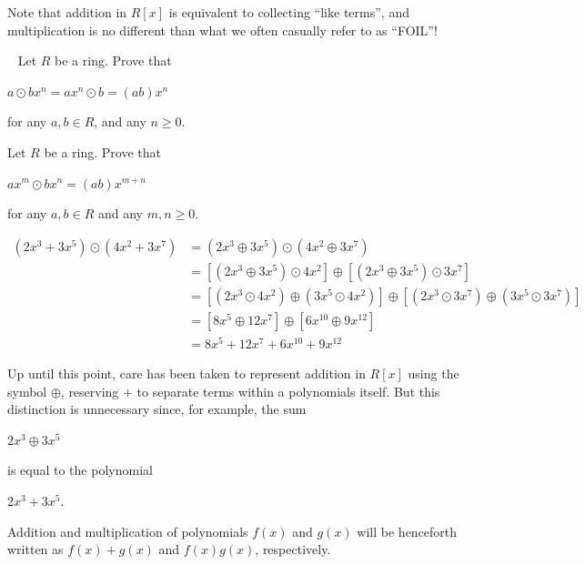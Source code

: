 \documentclass[11pt,fleqn,dvipsnames,usenames]{article}
\newcommand{\p}{\noindent}
\begin{document}
\p Note that addition in $R[x]$ is equivalent to collecting ``like terms'', and multiplication is no different than what we often casually refer to as ``FOIL''!
\vsp

\begin{example}~ Let $R$ be a ring.  Prove that
\begin{center}
$a\odot bx^{n} = ax^{n}\odot b = (ab)x^{n}$
\end{center}
for any $a,b\in R$, and any $n\geq 0$.
\end{example}
\vsp

\begin{exercise} Let $R$ be a ring.  Prove that
\begin{center}
$ax^{m}\odot bx^{n} = (ab)x^{m+n}$
\end{center}
for any $a,b\in R$ and any $m,n\geq 0$.
\end{exercise}
\vsmsp

%
\begin{example}
\begin{align*}
(2x^3 + 3x^5)\odot (4x^2 + 3x^7) &= (2x^3 \oplus 3x^5)\odot (4x^2 \oplus 3x^7)\\
&= \left[(2x^3 \oplus 3x^5)\odot 4x^2\right] \oplus \left[(2x^3 \oplus 3x^5) \odot 3x^7\right]\\
&= \left[(2x^3 \odot 4x^2) \oplus (3x^5 \odot 4x^2)\right] \oplus \left[(2x^3 \odot 3x^7) \oplus (3x^5\odot 3x^7)\right]\\
&= \left[8x^5 \oplus 12x^7\right] \oplus \left[6x^{10} \oplus 9x^{12}\right]\\
&= 8x^5 + 12x^7 + 6x^{10} + 9x^{12}
\end{align*}
\end{example}
%
\remark Up until this point, care has been taken to represent addition in $R[x]$ using the symbol $\oplus$, reserving $+$ to separate terms within a polynomials itself.  But this distinction is unnecessary since, for example, the sum

\begin{center}
$2x^3 \oplus 3x^5$
\end{center}

\p is equal to the polynomial

\begin{center}
$2x^3 + 3x^5$.
\end{center}

\p Addition and multiplication of polynomials $f(x)$ and $g(x)$ will be henceforth written as $f(x) + g(x)$ and $f(x)g(x)$, respectively.
\end{document}
